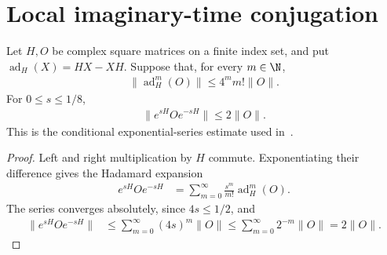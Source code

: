 \section{Local imaginary-time conjugation}

\begin{theorem}
    \label{thm:factorial_commutator_conjugation}
    \leanok
    Let $H,O$ be complex square matrices on a finite index set, and put
    $\operatorname{ad}_H(X)=HX-XH$. Suppose that, for every $m\in\N$,
    \begin{align}
        \bigl\lVert\operatorname{ad}_H^m(O)\bigr\rVert
        \le 4^m m!\lVert O\rVert.
    \end{align}
    For $0\le s\le1/8$,
    \begin{align}
        \bigl\lVert e^{sH}Oe^{-sH}\bigr\rVert\le2\lVert O\rVert.
    \end{align}
    This is the conditional exponential-series estimate used
    in~\cite[lines 795--837]{Arad2014Connecting}.
\end{theorem}
\begin{proof}\leanok
    Left and right multiplication by $H$ commute. Exponentiating their
    difference gives the Hadamard expansion
    \begin{align}
        e^{sH}Oe^{-sH}
         & =\sum_{m=0}^{\infty}\frac{s^m}{m!}\operatorname{ad}_H^m(O).
    \end{align}
    The series converges absolutely, since $4s\le1/2$, and
    \begin{align}
        \bigl\lVert e^{sH}Oe^{-sH}\bigr\rVert
         & \le\sum_{m=0}^{\infty}(4s)^m\lVert O\rVert
        \le\sum_{m=0}^{\infty}2^{-m}\lVert O\rVert
        =2\lVert O\rVert.
    \end{align}
\end{proof}

